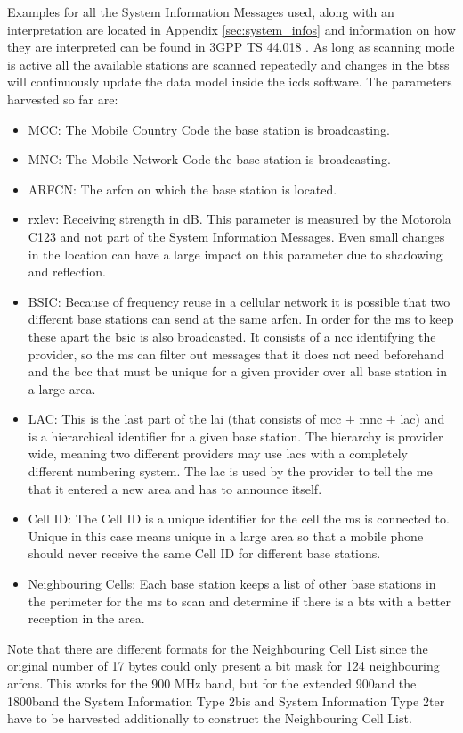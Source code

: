 Examples for all the System Information Messages used, along with an interpretation are located in Appendix \ref{sec:system_infos} and information on how they are interpreted can be found in 3GPP TS 44.018 \cite{sysinfos}.
As long as scanning mode is active all the available stations are scanned repeatedly and changes in the \glspl{bts} will continuously update the data model inside the \gls{icds} software.
The parameters harvested so far are:
\begin{itemize}
	\item MCC: The Mobile Country Code the base station is broadcasting.
	\item MNC: The Mobile Network Code the base station is broadcasting.
	\item ARFCN: The \gls{arfcn} on which the base station is located.
	\item rxlev: Receiving strength in dB.
	This parameter is measured by the Motorola C123 and not part of the System Information Messages.
	Even small changes in the location can have a large impact on this parameter due to shadowing and reflection.
	\item BSIC: Because of frequency reuse in a cellular network it is possible that two different base stations can send at the same \gls{arfcn}.
	In order for the \gls{ms} to keep these apart the \gls{bsic} is also broadcasted.
	It consists of a \gls{ncc} identifying the provider, so the \gls{ms} can filter out messages that it does not need beforehand and the \gls{bcc} that must be unique for a given provider over all base station in a large area.
	\item LAC: This is the last part of the \gls{lai} (that consists of \gls{mcc} + \gls{mnc} + \gls{lac}) and is a hierarchical identifier for a given base station.
	The hierarchy is provider wide, meaning two different providers may use \glspl{lac} with a completely different numbering system.
	The \gls{lac} is used by the provider to tell the \gls{me} that it entered a new area and has to announce itself.
	\item Cell ID: The Cell ID is a unique identifier for the cell the \gls{ms} is connected to.
	Unique in this case means unique in a large area so that a mobile phone should never receive the same Cell ID for different base stations. 
	\item Neighbouring Cells: Each base station keeps a list of other base stations in the perimeter  for the \gls{ms} to scan and determine if there is a \gls{bts} with a better reception in the area.
\end{itemize}
Note that there are different formats for the Neighbouring Cell List since the original number of 17 bytes could only present a bit mask for 124 neighbouring \glspl{arfcn}.
This works for the 900 MHz band, but for the extended 900\MHz and the 1800\MHz band the System Information Type 2bis and System Information Type 2ter have to be harvested additionally to construct the Neighbouring Cell List.

